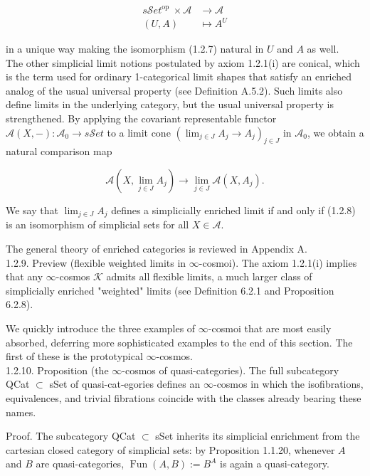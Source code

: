 \documentclass[10pt]{article}
\begin{document}
$$
\begin{aligned}
s \mathcal{S} e t^{\text {op }} \times \mathcal{A} & \longrightarrow \mathcal{A} \\
(U, A) & \longmapsto A^{U}
\end{aligned}
$$

in a unique way making the isomorphism (1.2.7) natural in $U$ and $A$ as well.\\
The other simplicial limit notions postulated by axiom 1.2.1(i) are conical, which is the term used for ordinary 1-categorical limit shapes that satisfy an enriched analog of the usual universal property (see Definition A.5.2). Such limits also define limits in the underlying category, but the usual universal property is strengthened. By applying the covariant representable functor $\mathcal{A}(X,-): \mathcal{A}_{0} \rightarrow s \mathcal{S} e t$ to a limit cone $\left(\lim _{j \in J} A_{j} \rightarrow A_{j}\right)_{j \in J}$ in $\mathcal{A}_{0}$, we obtain a natural comparison map


\begin{equation*}
\mathcal{A}\left(X, \lim _{j \in J} A_{j}\right) \longrightarrow \lim _{j \in J} \mathcal{A}\left(X, A_{j}\right) . \tag{1.2.8}
\end{equation*}


We say that $\lim _{j \in J} A_{j}$ defines a simplicially enriched limit if and only if (1.2.8) is an isomorphism of simplicial sets for all $X \in \mathcal{A}$.

The general theory of enriched categories is reviewed in Appendix A.\\
1.2.9. Preview (flexible weighted limits in $\infty$-cosmoi). The axiom 1.2.1(i) implies that any $\infty$-cosmos $\mathcal{K}$ admits all flexible limits, a much larger class of simplicially enriched "weighted" limits (see Definition 6.2.1 and Proposition 6.2.8).

We quickly introduce the three examples of $\infty$-cosmoi that are most easily absorbed, deferring more sophisticated examples to the end of this section. The first of these is the prototypical $\infty$-cosmos.\\
1.2.10. Proposition (the $\infty$-cosmos of quasi-categories). The full subcategory QCat $\subset$ sSet of quasi-cat-egories defines an $\infty$-cosmos in which the isofibrations, equivalences, and trivial fibrations coincide with the classes already bearing these names.

Proof. The subcategory QCat $\subset$ sSet inherits its simplicial enrichment from the cartesian closed category of simplicial sets: by Proposition 1.1.20, whenever $A$ and $B$ are quasi-categories, $\operatorname{Fun}(A, B):=B^{A}$ is again a quasi-category.
\end{document}
